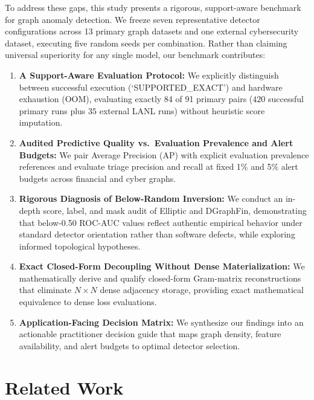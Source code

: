 \documentclass[applsci,article,submit,moreauthors,pdftex]{Definitions/mdpi}
\begin{document}
To address these gaps, this study presents a rigorous, support-aware benchmark for graph anomaly detection. We freeze seven representative detector configurations across 13 primary graph datasets and one external cybersecurity dataset, executing five random seeds per combination. Rather than claiming universal superiority for any single model, our benchmark contributes:
\begin{enumerate}
    \item \textbf{A Support-Aware Evaluation Protocol:} We explicitly distinguish between successful execution (`SUPPORTED\_EXACT') and hardware exhaustion (OOM), evaluating exactly 84 of 91 primary pairs ($420$ successful primary runs plus $35$ external LANL runs) without heuristic score imputation.
    \item \textbf{Audited Predictive Quality vs.\ Evaluation Prevalence and Alert Budgets:} We pair Average Precision (AP) with explicit evaluation prevalence references and evaluate triage precision and recall at fixed 1\% and 5\% alert budgets across financial and cyber graphs.
    \item \textbf{Rigorous Diagnosis of Below-Random Inversion:} We conduct an in-depth score, label, and mask audit of Elliptic and DGraphFin, demonstrating that below-0.50 ROC-AUC values reflect authentic empirical behavior under standard detector orientation rather than software defects, while exploring informed topological hypotheses.
    \item \textbf{Exact Closed-Form Decoupling Without Dense Materialization:} We mathematically derive and qualify closed-form Gram-matrix reconstructions that eliminate $N \times N$ dense adjacency storage, providing exact mathematical equivalence to dense loss evaluations.
    \item \textbf{Application-Facing Decision Matrix:} We synthesize our findings into an actionable practitioner decision guide that maps graph density, feature availability, and alert budgets to optimal detector selection.
\end{enumerate}

\section{Related Work}
\label{sec:related}
\end{document}
